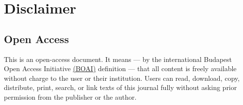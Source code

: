 \thispagestyle{plain}

\chapter*{Disclaimer}

\section*{Open Access}

This is an open-access document.
It means 
--- by the international Budapest Open Access Initiative 
\href{https://www.budapestopenaccessinitiative.org/}{(BOAI)}
definition --- that all content is freely available without charge to the user or their institution.
Users can read, download, copy, distribute, print, search, 
or link texts of this journal fully without asking prior permission from the publisher or the author.

